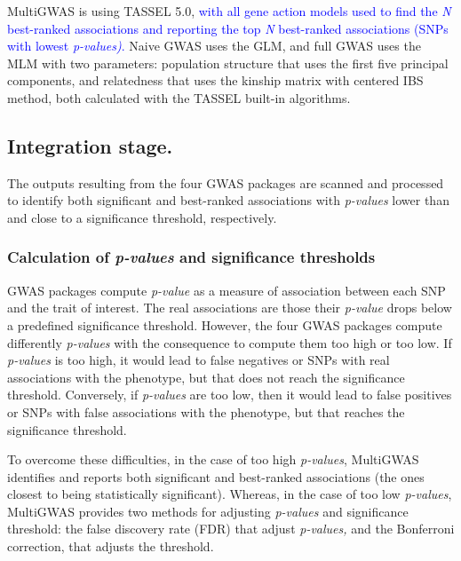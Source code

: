 \documentclass{article}
\begin{document}
MultiGWAS is using TASSEL 5.0, \textcolor{blue}{with all gene action models used to find the }\textcolor{blue}{\emph{N }}\textcolor{blue}{best-ranked associations and reporting the top }\textcolor{blue}{\emph{N }}\textcolor{blue}{best-ranked associations (SNPs with lowest }\textcolor{blue}{\emph{p-values)}}\textcolor{blue}{.} Naive GWAS uses the GLM, and full GWAS uses the MLM with two parameters: population structure that uses the first five principal components, and relatedness that uses the kinship matrix with centered IBS method, both calculated with the TASSEL built-in algorithms. 


\subsection{Integration stage.}
\color{blue} The outputs resulting from the four GWAS packages are scanned and processed to identify both significant and best-ranked associations with \emph{p-values} lower than and close to a significance threshold, respectively. 

\subsubsection{Calculation of \emph{p-values }and significance thresholds}

GWAS packages compute \emph{p-value }as a measure of association between each SNP and the trait of interest. The real associations are those their \emph{p-value }drops below a predefined significance threshold. However, the four GWAS packages compute differently \emph{p-values} with the consequence to compute them too high or too low. If \emph{p-values} is too high, it would lead to false negatives or SNPs with real associations with the phenotype, but that does not reach the significance threshold. Conversely, if \emph{p-values} are too low, then it would lead to false positives or SNPs with false associations with the phenotype, but that reaches the significance threshold.

To overcome these difficulties, in the case of too high \emph{p-values}, MultiGWAS identifies and reports both significant and best-ranked associations (the ones closest to being statistically significant). Whereas, in the case of too low \emph{p-values}, MultiGWAS provides two methods for adjusting \emph{p-values} and significance threshold: the false discovery rate (FDR) that adjust \emph{p-values, }and the Bonferroni correction, that adjusts the threshold.
\end{document}
